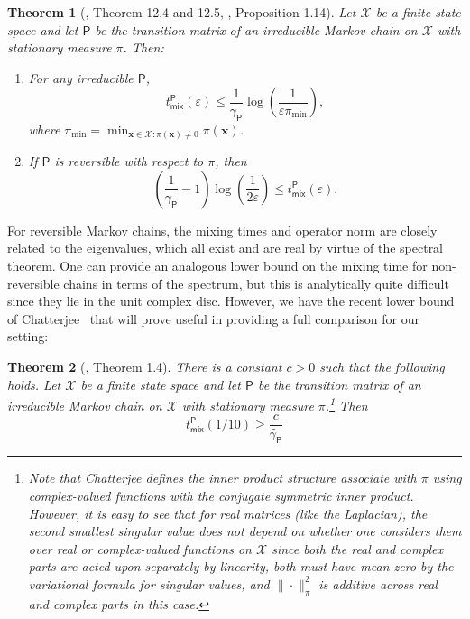 \documentclass[11pt]{article}
\newtheorem{theorem}{Theorem}[section]
\begin{document}
\begin{theorem}[\cite{levin2017markov}, Theorem 12.4 and 12.5, \cite{tetali}, Proposition 1.14]
\label{thm:markov_mixing}
    Let $\mathcal{X}$ be a finite state space and let $\mathsf{P}$ be the transition matrix of an irreducible Markov chain on $\mathcal{X}$ with stationary measure $\pi$. Then:
    \begin{enumerate}
        \item For any irreducible $\mathsf{P}$,
        \begin{equation*}
             t_{\mathsf{mix}}^{\mathsf{P}}(\varepsilon)\leq \frac{1}{\gamma_{\mathsf{P}}}\log\left(\frac{1}{\varepsilon\pi_{\min}}\right),
        \end{equation*}
        where $\pi_{\min}=\min_{\bm{x}\in \mathcal{X}:\pi(\bm{x})\neq 0} \pi(\bm{x})$.
        \item If $\mathsf{P}$ is reversible with respect to $\pi$, then
        \begin{equation*}
            \left(\frac{1}{\gamma_{\mathsf{P}}}-1\right)\log\left(\frac{1}{2\varepsilon}\right)\leq t_{\mathsf{mix}}^{\mathsf{P}}(\varepsilon).
        \end{equation*}
    \end{enumerate}
\end{theorem}

For reversible Markov chains, the mixing times and operator norm are closely related to the eigenvalues, which all exist and are real by virtue of the spectral theorem. One can provide an analogous lower bound on the mixing time for non-reversible chains in terms of the spectrum, but this is analytically quite difficult since they lie in the unit complex disc. However, we have the recent lower bound of Chatterjee~\cite{chatterjee2023spectral} that will prove useful in providing a full comparison for our setting:

\begin{theorem}[\cite{chatterjee2023spectral}, Theorem 1.4]
\label{thm:nr_lb}
    There is a constant $c>0$ such that the following holds. Let $\mathcal{X}$ be a finite state space and let $\mathsf{P}$ be the transition matrix of an irreducible Markov chain on $\mathcal{X}$ with stationary measure $\pi$.\footnote{Note that Chatterjee defines the inner product structure associate with $\pi$ using complex-valued functions with the conjugate symmetric inner product. However, it is easy to see that for real matrices (like the Laplacian), the second smallest singular value does not depend on whether one considers them over real or complex-valued functions on $\mathcal{X}$ since both the real and complex parts are acted upon separately by linearity, both must have mean zero by the variational formula for singular values, and $\|\cdot\|_{\pi}^2$ is additive across real and complex parts in this case.} Then 
    \begin{equation*}
        t_{\mathsf{mix}}^{\mathsf{P}}(1/10)\geq \frac{c}{\widetilde{\gamma_{\mathsf{P}}}} 
    \end{equation*}
\end{theorem}
\end{document}
